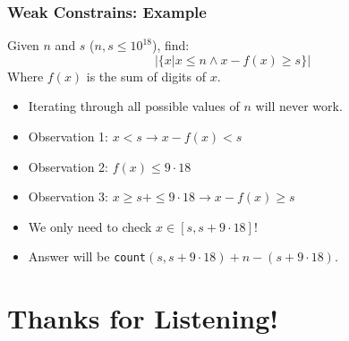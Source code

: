 \documentclass{beamer}
\begin{document}
\begin{frame}
	\frametitle{Weak Constrains: Example}

	Given $n$ and $s$ ($n,s \leq 10^{18}$), find:
	$$|\{x | x \leq n \wedge x - f(x) \geq s\}|$$
	Where $f(x)$ is the sum of digits of $x$.

	\begin{itemize}
		\item Iterating through all possible values of $n$ will never work.
		\item<2-> Observation 1: $x < s \rightarrow x - f(x) < s$
		\item<3-> Observation 2: $f(x) \leq 9 \cdot 18$
		\item<4-> Observation 3: $x \geq s + \leq 9 \cdot 18 \rightarrow x - f(x) \geq s$
		\item<5-> We only need to check $x \in [s, s + 9 \cdot 18]$!
		\item<5-> Answer will be \texttt{count}$(s, s + 9 \cdot 18) + n - (s + 9 \cdot 18)$.
	\end{itemize}
\end{frame}

\section{Thanks for Listening!}
\end{document}
